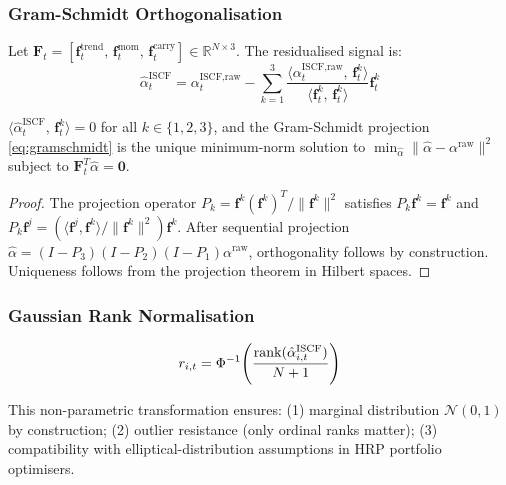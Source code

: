 \documentclass[12pt,a4paper]{article}
\begin{document}
\subsubsection{Gram-Schmidt Orthogonalisation}
\label{sec:gramschmidt}

Let $\mathbf{F}_t = [\mathbf{f}_t^{\text{trend}},\, \mathbf{f}_t^{\text{mom}},\, \mathbf{f}_t^{\text{carry}}] \in \mathbb{R}^{N \times 3}$. The residualised signal is:
\begin{equation}
  \hat{\alpha}_t^{\text{ISCF}} = \alpha_t^{\text{ISCF,raw}}
    - \sum_{k=1}^{3}\frac{\langle\alpha_t^{\text{ISCF,raw}},\, \mathbf{f}_t^k\rangle}
                         {\langle\mathbf{f}_t^k,\, \mathbf{f}_t^k\rangle}
      \mathbf{f}_t^k
  \label{eq:gramschmidt}
\end{equation}

\begin{proposition}
$\langle\hat{\alpha}_t^{\text{ISCF}},\, \mathbf{f}_t^k\rangle = 0$ for all $k \in \{1,2,3\}$, and the Gram-Schmidt projection \eqref{eq:gramschmidt} is the unique minimum-norm solution to $\min_{\hat{\alpha}}\|\hat{\alpha} - \alpha^{\text{raw}}\|^2$ subject to $\mathbf{F}_t^T\hat{\alpha} = \mathbf{0}$.
\end{proposition}

\begin{proof}
The projection operator $P_k = \mathbf{f}^k(\mathbf{f}^k)^T/\|\mathbf{f}^k\|^2$ satisfies $P_k\mathbf{f}^k = \mathbf{f}^k$ and $P_k\mathbf{f}^j = (\langle\mathbf{f}^j,\mathbf{f}^k\rangle/\|\mathbf{f}^k\|^2)\mathbf{f}^k$. After sequential projection $\hat{\alpha} = (I - P_3)(I-P_2)(I-P_1)\alpha^{\text{raw}}$, orthogonality follows by construction. Uniqueness follows from the projection theorem in Hilbert spaces.
\end{proof}

\subsubsection{Gaussian Rank Normalisation}

\begin{equation}
  r_{i,t} = \Phi^{-1}\!\left(\frac{\operatorname{rank}(\hat{\alpha}_{i,t}^{\text{ISCF}})}{N+1}\right)
  \label{eq:rankn}
\end{equation}

This non-parametric transformation ensures: (1) marginal distribution $\mathcal{N}(0,1)$ by construction; (2) outlier resistance (only ordinal ranks matter); (3) compatibility with elliptical-distribution assumptions in HRP portfolio optimisers.
\end{document}
